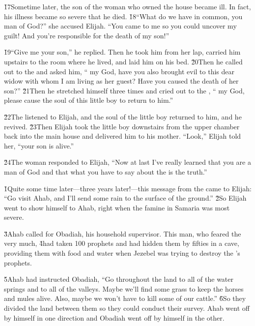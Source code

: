 \v{17}Sometime later, the son of the woman who owned the house became ill. In fact, his illness became so severe that he died. \v{18}``What do we have in common, you man of God?'' she accused Elijah. ``You came to me so you could uncover my guilt! And you're responsible for the death of my son!''

\v{19}``Give me your son,'' he replied. Then he took him from her lap, carried him upstairs to the room where he lived, and laid him on his bed. \v{20}Then he called out to the  and asked him, `` my God, have you also brought evil to this dear widow with whom I am living as her guest? Have you caused the death of her son?'' \v{21}Then he stretched himself three times and cried out to the , `` my God, please cause the soul of this little boy to return to him.''

\v{22}The  listened to Elijah, and the soul of the little boy returned to him, and he revived. \v{23}Then Elijah took the little boy downstairs from the upper chamber back into the main house and delivered him to his mother. ``Look,'' Elijah told her, ``your son is alive.''

\v{24}The woman responded to Elijah, ``Now at last I've really learned that you are a man of God and that what you have to say about the  is the truth.''

\v{1}Quite some time later---three years later!---this message from the  came to Elijah: ``Go visit Ahab, and I'll send some rain to the surface of the ground.'' \v{2}So Elijah went to show himself to Ahab, right when the famine in Samaria was most severe.

\v{3}Ahab called for Obadiah, his household supervisor. This man, who feared the  very much, \v{4}had taken 100 prophets and had hidden them by fifties in a cave, providing them with food and water when Jezebel was trying to destroy the 's prophets.

\v{5}Ahab had instructed Obadiah, ``Go throughout the land to all of the water springs and to all of the valleys. Maybe we'll find some grass to keep the horses and mules alive. Also, maybe we won't have to kill some of our cattle.'' \v{6}So they divided the land between them so they could conduct their survey. Ahab went off by himself in one direction and Obadiah went off by himself in the other.

